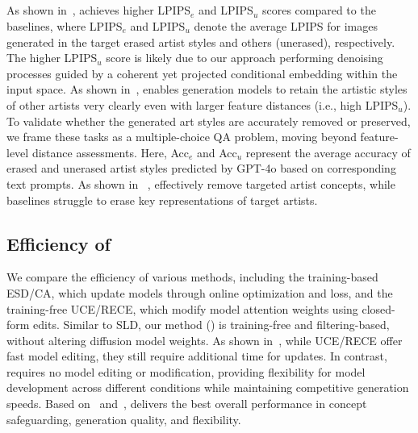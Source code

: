 \subsection{}
As shown in~, \ours{} achieves higher LPIPS$_e$ and LPIPS$_u$ scores compared to the baselines, where LPIPS$_e$ and LPIPS$_u$ denote the average LPIPS for images generated in the target erased artist styles and others (unerased), respectively. The higher LPIPS$_u$ score is likely due to our approach performing denoising processes guided by a coherent yet projected conditional embedding within the input space. As shown in~, \ours{} enables generation models to retain the artistic styles of other artists very clearly even with larger feature distances (i.e., high LPIPS$_u$). 
To validate whether the generated art styles are accurately removed or preserved, we frame these tasks as a multiple-choice QA problem, moving beyond feature-level distance assessments. Here, Acc$_e$ and Acc$_u$ represent the average accuracy of erased and unerased artist styles predicted by GPT-4o based on corresponding text prompts. As shown in ~, \ours{} effectively remove targeted artist concepts, while baselines struggle to erase key representations of target artists. 



% 


\subsection{Efficiency of \ours{}}
We compare the efficiency of various methods, including the training-based ESD/CA, which update models through online optimization and loss, and the training-free UCE/RECE, which modify model attention weights using closed-form edits. Similar to SLD, our method (\ours{}) is training-free and filtering-based, without altering diffusion model weights. As shown in~,  while UCE/RECE offer fast model editing, they still require additional time for updates. In contrast, \ours{} requires no model editing or modification, providing flexibility for model development across different conditions while maintaining competitive generation speeds. 
Based on~ and~, \ours{} delivers the best overall performance in concept safeguarding, generation quality, and flexibility.





